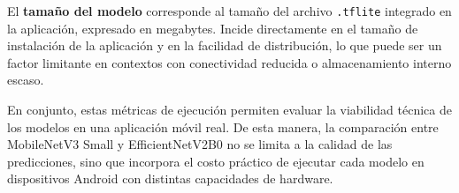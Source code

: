 El \textbf{tamaño del modelo} corresponde al tamaño del archivo \texttt{.tflite} integrado en la aplicación, expresado en
megabytes. Incide directamente en el tamaño de instalación de la aplicación y en la facilidad de distribución, lo que puede ser
un factor limitante en contextos con conectividad reducida o almacenamiento interno escaso.

En conjunto, estas métricas de ejecución permiten evaluar la viabilidad técnica de los modelos en una aplicación móvil real.
De esta manera, la comparación entre MobileNetV3 Small y EfficientNetV2B0 no se limita a la calidad de las predicciones, sino
que incorpora el costo práctico de ejecutar cada modelo en dispositivos Android con distintas capacidades de hardware.
